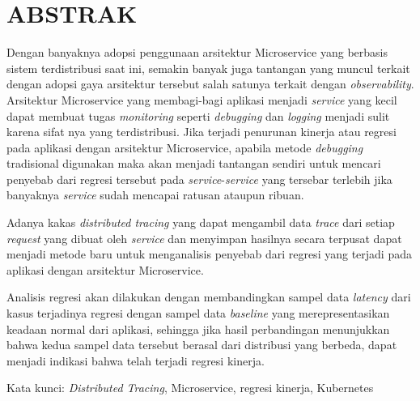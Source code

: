 \clearpage
\chapter*{ABSTRAK}

Dengan banyaknya adopsi penggunaan arsitektur Microservice yang berbasis sistem terdistribusi saat ini, semakin banyak juga tantangan yang muncul terkait dengan adopsi gaya arsitektur tersebut salah satunya terkait dengan \textit{observability}. Arsitektur Microservice yang membagi-bagi aplikasi menjadi \textit{service} yang kecil dapat membuat tugas \textit{monitoring} seperti \textit{debugging} dan \textit{logging} menjadi sulit karena sifat nya yang terdistribusi. Jika terjadi penurunan kinerja atau regresi pada aplikasi dengan arsitektur Microservice, apabila metode \textit{debugging} tradisional digunakan maka akan menjadi tantangan sendiri untuk mencari penyebab dari regresi tersebut pada \textit{service}-\textit{service} yang tersebar terlebih jika banyaknya \textit{service} sudah mencapai ratusan ataupun ribuan. 

Adanya kakas \textit{distributed tracing} yang dapat mengambil data  \textit{trace} dari setiap \textit{request} yang dibuat oleh \textit{service} dan menyimpan hasilnya secara terpusat dapat menjadi metode baru untuk menganalisis penyebab dari regresi yang terjadi pada aplikasi dengan arsitektur Microservice.

Analisis regresi akan dilakukan dengan membandingkan sampel data \textit{latency} dari kasus terjadinya regresi dengan sampel data \textit{baseline} yang merepresentasikan keadaan normal dari aplikasi, sehingga jika hasil perbandingan menunjukkan bahwa kedua sampel data tersebut berasal dari distribusi yang berbeda, dapat menjadi indikasi bahwa telah terjadi regresi kinerja.





\vspace{15mm}
Kata kunci: \textit{Distributed Tracing}, Microservice, regresi kinerja, Kubernetes
\clearpage